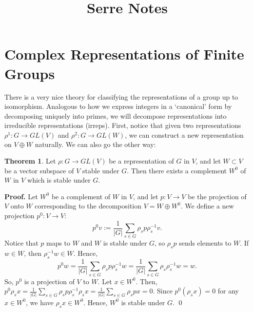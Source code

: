 \documentclass{article}
\title{Serre Notes}
\date{}
\theoremstyle{definition}
\newtheorem{theorem}{Theorem}[section]
\begin{document}
\maketitle
\section{Complex Representations of Finite Groups}
There is a very nice theory for classifying the representations of a group up to isomorphism. Analogous to how we express integers in a `canonical' form by decomposing uniquely into primes, we will decompose representations into irreducible representations (irreps).
\newline
\newline
First, notice that given two representations $\rho^1:G\rightarrow GL(V)$ and $\rho^2:G\rightarrow GL(W)$, we can construct a new representation on $V\oplus W$ naturally. We can also go the other way:

\begin{theorem}
Let $\rho:G\rightarrow GL(V)$ be a representation of $G$ in $V$, and let $W\subset V$ be a vector subspace of $V$ stable under $G$. Then there exists a complement $W^0$ of $W$ in $V$ which is stable under $G$.
\end{theorem}
\textbf{Proof.} Let $W^0$ be a complement of $W$ in $V$, and let $p:V\rightarrow V$ be the projection of $V$ onto $W$ corresponding to the decomposition $V=W\oplus W^0$. We define a new projection $p^0:V\rightarrow V$:
\begin{equation*}
    p^0v:=\frac1{|G|}\sum_{s\in G}\rho_s p\rho_s^{-1}v.
\end{equation*}
Notice that $p$ maps to $W$ and $W$ is stable under $G$, so $\rho_sp$ sends elements to $W$. If $w\in W$, then $\rho_s^{-1}w\in W$. Hence,
\begin{equation*}
    p^0w=\frac1{|G|}\sum_{s\in G}\rho_s p\rho_s^{-1}w=\frac1{|G|}\sum_{s\in G}\rho_s \rho_s^{-1}w=w.
\end{equation*} 
So, $p^0$ is a projection of $V$ to $W$.
\newline
\newline
Let $x\in W^0$. Then, $p^0\rho_s x=\frac1{|G|}\sum_{s\in G}\rho_s p\rho_s^{-1}\rho_s x=\frac1{|G|}\sum_{s\in G}\rho_s px=0$. Since $p^0(\rho_s x)=0$ for any $x\in W^0$, we have $\rho_s x\in W^0$. Hence, $W^0$ is stable under $G$. \qed
\end{document}

